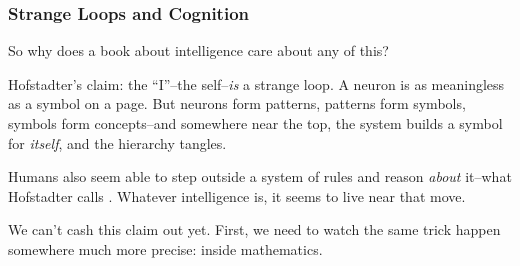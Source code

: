 \documentclass[aspectratio=169]{beamer}
\begin{document}
\begin{frame}[fragile]
  \frametitle{Strange Loops and Cognition}


  So why does a book about intelligence care about any of this?

  \pause
  \vspace{\fill}

  Hofstadter's claim: the ``I''--the self--\textit{is} a strange loop.
  A neuron is as meaningless as a symbol on a page. But neurons form
  patterns, patterns form symbols, symbols form concepts--and
  somewhere near the top, the system builds a symbol for
  \textit{itself}, and the hierarchy tangles.

  \pause
  \vspace{\fill}

  Humans also seem able to step outside a system of rules and reason
  \textit{about} it--what Hofstadter calls . Whatever intelligence is, it seems to live near that move.

  \pause
  \vspace{\fill}

  We can't cash this claim out yet. First, we need to watch the same
  trick happen somewhere much more precise: inside mathematics.
\end{frame}
\end{document}
